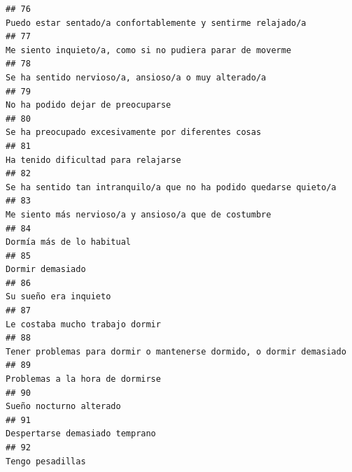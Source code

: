 \documentclass[
]{article}
\begin{document}
\begin{verbatim}
## 76                                                                                              Puedo estar sentado/a confortablemente y sentirme relajado/a
## 77                                                                                                 Me siento inquieto/a, como si no pudiera parar de moverme
## 78                                                                                                      Se ha sentido nervioso/a, ansioso/a o muy alterado/a
## 79                                                                                                                         No ha podido dejar de preocuparse
## 80                                                                                                       Se ha preocupado excesivamente por diferentes cosas
## 81                                                                                                                       Ha tenido dificultad para relajarse
## 82                                                                                        Se ha sentido tan intranquilo/a que no ha podido quedarse quieto/a
## 83                                                                                                     Me siento más nervioso/a y ansioso/a que de costumbre
## 84                                                                                                                                 Dormía más de lo habitual
## 85                                                                                                                                          Dormir demasiado
## 86                                                                                                                                     Su sueño era inquieto
## 87                                                                                                                           Le costaba mucho trabajo dormir
## 88                                                                                      Tener problemas para dormir o mantenerse dormido, o dormir demasiado
## 89                                                                                                                           Problemas a la hora de dormirse
## 90                                                                                                                                   Sueño nocturno alterado
## 91                                                                                                                            Despertarse demasiado temprano
## 92                                                                                                                                          Tengo pesadillas

\end{verbatim}
\end{document}
